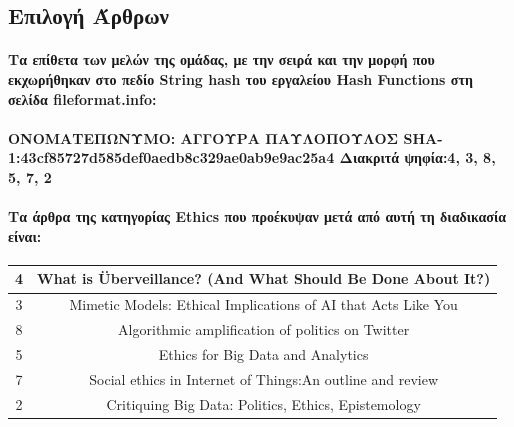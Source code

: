 \documentclass[12pt, A4]{article}
\newcommand{\tl}{\textlatin}
\begin{document}
    \subsection{Επιλογή Άρθρων}
    \begin{spacing}{1.25}
        \paragraph{Τα επίθετα των μελών της ομάδας, με την σειρά και την μορφή που εκχωρήθηκαν στο πεδίο \tl{String hash} του εργαλείου \tl{Hash Functions} στη σελίδα \tl{fileformat.info}:\\~\\
        ΟΝΟΜΑΤΕΠΩΝΥΜΟ: ΑΓΓΟΥΡΑ ΠΑΥΛΟΠΟΥΛΟΣ \newline
        \tl{SHA-1:}\hspace{3.9cm}\tl{43cf85727d585def0aedb8c329ae0ab9e9ac25a4} \newline
        Διακριτά ψηφία:\hspace{1.9cm}4, 3, 8, 5, 7, 2}
        
        \paragraph{Τα άρθρα της κατηγορίας \tl{Ethics} που προέκυψαν μετά από αυτή τη διαδικασία είναι:\\}
    
        \begin{center}
            \begin{tabular}{ |c|c| }
                 \hline
                 4 & \tl{What is Überveillance? (And What Should Be Done About It?)}\\
                 \hline
                 3 & \tl{Mimetic Models: Ethical Implications of AI that Acts Like You}\\
                 \hline
                 8 & \tl{Algorithmic amplification of politics on Twitter}\\
                 \hline
                 5 & \tl{Ethics for Big Data and Analytics}\\
                 \hline
                 7 & \tl{Social ethics in Internet of Things:An outline and review}\\
                 \hline
                 2 & \tl{Critiquing Big Data: Politics, Ethics, Epistemology}\\ 
                 \hline
            \end{tabular}
        \end{center}
    \end{spacing}
\end{document}
